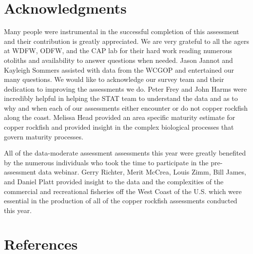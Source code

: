 \documentclass[11pt,
  english,
  a4paper,
]{article}
\begin{document}

\hypertarget{acknowledgments}{%
\section{Acknowledgments}\label{acknowledgments}}

\leavevmode\tagmcend\tagstructend


Many people were instrumental in the successful completion of this assessment and their contribution is greatly appreciated. We are very grateful to all the agers at WDFW, ODFW, and the CAP lab for their hard work reading numerous otoliths and availability to answer questions when needed. Jason Jannot and Kayleigh Sommers assisted with data from the WCGOP and entertained our many questions. We would like to acknowledge our survey team and their dedication to improving the assessments we do. Peter Frey and John Harms were incredibly helpful in helping the STAT team to understand the data and as to why and when each of our assessments either encounter or do not copper rockfish along the coast. Melissa Head provided an area specific maturity estimate for copper rockfish and provided insight in the complex biological processes that govern maturity processes.

\leavevmode\tagmcend\tagstructend\par


All of the data-moderate assessment assessments this year were greatly benefited by the numerous individuals who took the time to participate in the pre-assessment data webinar. Gerry Richter, Merit McCrea, Louis Zimm, Bill James, and Daniel Platt provided insight to the data and the complexities of the commercial and recreational fisheries off the West Coast of the U.S. which were essential in the production of all of the copper rockfish assessments conducted this year.

\leavevmode\tagmcend\tagstructend\par

\clearpage


\hypertarget{references}{%
\section{References}\label{references}}
\end{document}
